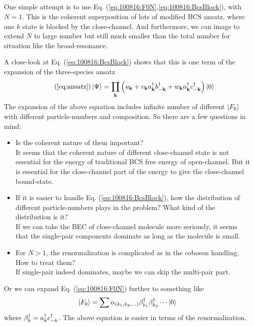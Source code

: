 \subsection{}
One simple attempt is to use Eq. (\ref{eq:100816:F0N},\ref{eq:100816:BcsBlock}),  with $N=1$.  This is the coherent superposition of lots of modified BCS ansatz, where one $k$ state is blocked by the close-channel.  And furthermore, we can image to extend $N$ to large number but still much smaller than the total number for situation like the broad-resonance.  

A close-look at Eq. (\ref{eq:100816:BcsBlock}) shows that this is one term of the expansion of the three-species ansatz
\begin{equation}\tag{\ref{eq:ansatz}}
 \ket{\Psi}=\prod_\vk\br{u_\vk+v_\vk{}a^\dg_\vk{}b^\dg_{-\vk}+w_\vk{}a^\dg_\vk{}c^\dg_{-\vk}}\ket{0}
\end{equation}
The expansion of the above equation includes infinite number of different $\left|F_{0}\right>$ with different particle-numbers and composition.  So there are a few questions in mind:

\begin{itemize}
\item Is the coherent nature of them important?\\
It seems that the coherent nature of different close-channel state is not essential for the energy of traditional BCS free energy of open-channel.  But it is essential for the close-channel part of the energy to give the close-channel bound-state.  
\item If it is easier to handle Eq. (\ref{eq:100816:BcsBlock}), how the distribution of different particle-numbers plays in the problem?  What kind of the distribution is it? \\
If we can take the BEC of close-channel molecule more seriously, it seems that the single-pair components dominate as long as the molecule is small.  
\item For $N>1$, the renormalization is complicated as in the coboson handling.  How to treat them? \\
If single-pair indeed dominates, maybe we can skip the multi-pair part.  
\end{itemize}

Or we can expand Eq. (\ref{eq:100816:F0N}) further to something like 
\begin{equation}\label{eq:100823:F0N}
\left|F_{0}\right>=\sum\alpha_{(k_1,k_{2},...)}\beta^{\dagger}_{k_{1}}\beta^{\dagger}_{k_{2}}\cdots\left|0\right>
\end{equation}
where $\beta^{\dagger}_{k}=a^{\dagger}_{k}c^{\dagger}_{-k}$.
The above equation is easier in terms of the renormalization.  

